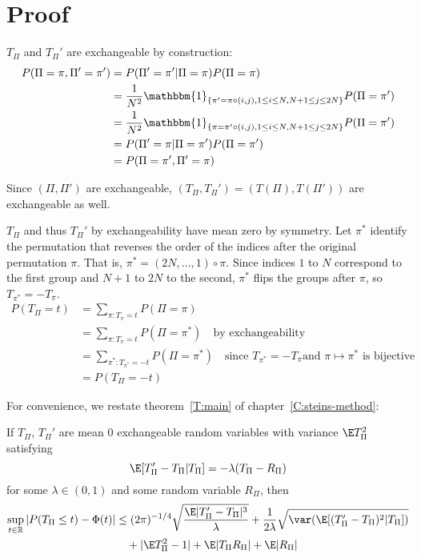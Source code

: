 \section{Proof}
$T_{\Pi}$ and $T_{\Pi}'$ are exchangeable by construction:  
\begin{align*}
  P(\Pi = \pi, \Pi' = \pi') &= P(\Pi' = \pi' | \Pi = \pi)P(\Pi = \pi) \\
  &= \frac{1}{N^2}\mathbbm{1}_{\{\pi'=\pi \circ (i,j), 1\leq i \leq N, N+1 \leq j \leq 2N\}} P(\Pi =
  \pi') \\
  &=\frac{1}{N^2}\mathbbm{1}_{\{\pi=\pi' \circ (i,j), 1\leq i \leq N, N+1 \leq j \leq 2N\}} P(\Pi =
  \pi') \\
  &= P(\Pi' = \pi | \Pi = \pi')P(\Pi = \pi') \\
  &= P(\Pi = \pi', \Pi' = \pi)
\end{align*}

Since $(\Pi, \Pi')$ are exchangeable, $(T_{\Pi}, T_{\Pi}') = (T(\Pi), T(\Pi'))$ are exchangeable as
well.  

$T_{\Pi}$ and thus $T_{\Pi}'$ by exchangeability have mean zero by symmetry.  Let $\pi^*$ identify
the permutation that reverses the order of the indices after the original permutation $\pi$.  That
is, $\pi^* = (2N, \ldots, 1) \circ \pi$.  Since indices $1$ to $N$ correspond to the first group and
$N+1$ to $2N$ to the second, $\pi^*$ flips the groups after $\pi$, so $T_{\pi^*} = -T_{\pi}$.
\begin{align*}
  P(T_{\Pi} = t) &= \sum_{\pi : T_{\pi} = t} P(\Pi = \pi) \\
  &= \sum_{\pi : T_{\pi} = t} P(\Pi = \pi^*) \quad \text{by exchangeability} \\
  &= \sum_{\pi^* : T_{\pi^*} = -t} P(\Pi = \pi^*) \quad \text{since } T_{\pi^*} = -T_{\pi} \text{
    and } \pi \mapsto \pi^* \text{ is bijective} \\
  &= P(T_{\Pi} = -t)
\end{align*}


For convenience, we restate theorem~\ref{T:main} of chapter~\ref{C:steins-method}:
\begin{theorem}
  If $T_{\Pi}$, $T_{\Pi}'$ are mean 0 exchangeable random variables with variance $\E T_{\Pi}^2$
  satisfying
  \begin{equation*}
    \E[T_{\Pi}'-T_{\Pi}|T_{\Pi}] = -\lambda(T_{\Pi}-R_{\Pi})    
  \end{equation*}
  for some $\lambda \in (0,1)$ and some random variable $R_{\Pi}$, then 
  \begin{equation*}
    \begin{split}
      \sup_{t \in \mathbb{R}} |P(T_{\Pi} \leq t) - \Phi(t)|
      &\leq (2\pi)^{-1/4} \sqrt{\frac{\E |T_{\Pi}'-T_{\Pi}|^3}{\lambda}}
      + \frac{1}{2\lambda} \sqrt{\var (\E [(T_{\Pi}'-T_{\Pi})^2|T_{\Pi}])} \\
      &\quad + |\E T_{\Pi}^2 - 1| + \E |T_{\Pi}R_{\Pi}| + \E |R_{\Pi}|
    \end{split}
  \end{equation*}
\end{theorem}


